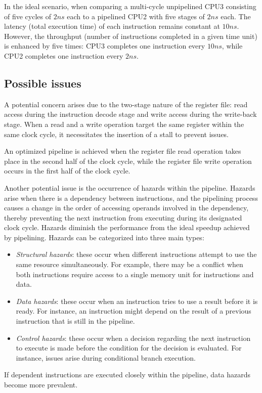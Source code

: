 In the ideal scenario, when comparing a multi-cycle unpipelined CPU3 consisting of five cycles of $2ns$ each to a pipelined CPU2 with five stages of $2ns$ each. 
The latency (total execution time) of each instruction remains constant at $10ns$.
However, the throughput (number of instructions completed in a given time unit) is enhanced by five times: CPU3 completes one instruction every $10ns$, while CPU2 completes one instruction every $2ns$.

\subsection{Possible issues}
A potential concern arises due to the two-stage nature of the register file: read access during the instruction decode stage and write access during the write-back stage.
When a read and a write operation target the same register within the same clock cycle, it necessitates the insertion of a stall to prevent issues.

\begin{definition}
    An optimized pipeline is achieved when the register file read operation takes place in the second half of the clock cycle, while the register file write operation occurs in the first half of the clock cycle.
\end{definition}

Another potential issue is the occurrence of hazards within the pipeline.
Hazards arise when there is a dependency between instructions, and the pipelining process causes a change in the order of accessing operands involved in the dependency, thereby preventing the next instruction from executing during its designated clock cycle.
Hazards diminish the performance from the ideal speedup achieved by pipelining.
Hazards can be categorized into three main types:
\begin{itemize}
    \item \textit{Structural hazards}: these occur when different instructions attempt to use the same resource simultaneously. 
        For example, there may be a conflict when both instructions require access to a single memory unit for instructions and data.
    \item \textit{Data hazards}: these occur when an instruction tries to use a result before it is ready. 
        For instance, an instruction might depend on the result of a previous instruction that is still in the pipeline.
    \item \textit{Control hazards}: these occur when a decision regarding the next instruction to execute is made before the condition for the decision is evaluated. 
        For instance, issues arise during conditional branch execution.
\end{itemize}
If dependent instructions are executed closely within the pipeline, data hazards become more prevalent.

